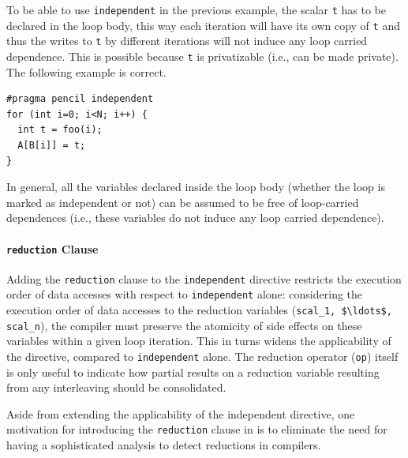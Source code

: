   To be able to use \lstinline!independent! in the previous example, the
  scalar \lstinline!t! has to be declared in the loop body, this way each
  iteration will have its own copy of \lstinline!t! and thus the writes to
  \lstinline!t! by different iterations will not induce any loop carried
  dependence.  This is possible because \lstinline!t! is privatizable (i.e.,
  can be made private).
  The following example is correct.

  \begin{lstlisting}[language=pencil]
#pragma pencil independent
for (int i=0; i<N; i++) {
  int t = foo(i);
  A[B[i]] = t;
}
  \end{lstlisting}
   
  In general, all the variables declared inside the loop body (whether the loop
  is marked as independent or not) can be assumed to be free of loop-carried
  dependences (i.e., these variables do not induce any loop carried dependence).
  
  \paragraph{\texttt{reduction} Clause}
  \label{reduction-clause}

  Adding the \lstinline!reduction! clause to the \lstinline!independent!
  directive restricts the execution order of data accesses with respect
  to \lstinline!independent! alone: considering 
  the execution order of data accesses to the reduction variables
  (\lstinline!scal_1, $\ldots$, scal_n!), the compiler must preserve
  the atomicity of side effects on these variables within a given
  loop iteration.
  This in turns widens the applicability of the directive, compared to
  \lstinline!independent! alone.
  The reduction operator (\lstinline!op!) itself is only useful to
  indicate how partial results on a reduction variable resulting from
  any interleaving should be consolidated.

  Aside from extending the applicability of the independent directive, one
  motivation for introducing the \lstinline!reduction!
  clause in \pencil is to eliminate the need for having a sophisticated
  analysis to detect reductions in \pencil compilers.


